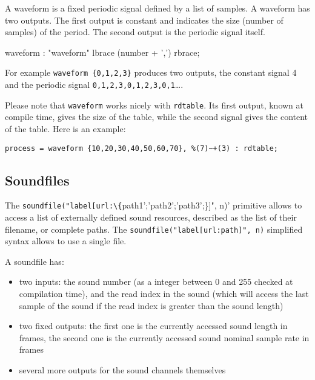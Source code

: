 A waveform is a fixed periodic signal defined by a list of samples. A waveform has two outputs. The first output is constant and indicates the size (number of samples) of the period. The second output is the periodic signal itself. 

  \begin{rail}
  waveform : "waveform" lbrace (number + ',') rbrace;
  \end{rail}

For example \lstinline'waveform {0,1,2,3}' produces two outputs, the constant signal 4 and the periodic signal \lstinline'0,1,2,3,0,1,2,3,0,1'\ldots. 

Please note that \lstinline'waveform' works nicely with \lstinline'rdtable'. Its first output, known at compile time, gives the size of the table, while the second signal gives the content of the table. Here is an example:
\begin{lstlisting}
process = waveform {10,20,30,40,50,60,70}, %(7)~+(3) : rdtable;
\end{lstlisting}

\bigskip

\subsection{Soundfiles}

The  \lstinline'soundfile("label[url:\{'path1';'path2';'path3';\}]", n)' primitive allows to access a list of externally defined sound resources, described as the list of their filename, or complete paths. The \lstinline'soundfile("label[url:path]", n)' simplified syntax allows to use a single file. 

A soundfile has:

\begin{itemize} 
\item two inputs: the sound number (as a integer between 0 and 255 checked at compilation time), and the read index in the sound (which will access the last sample of the sound if the read index is greater than the sound length)
\item two fixed outputs: the first one is the currently accessed sound length in frames, the second one is the currently accessed sound nominal sample rate in frames
\item several more outputs for the sound channels themselves
\end{itemize}

